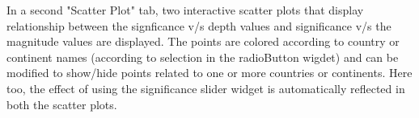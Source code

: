 \documentclass{article}
\begin{document}
		In a second "Scatter Plot" tab, two interactive scatter plots that display relationship between the signficance v/s depth values and significance v/s the magnitude values are displayed. The points are colored according to country or continent names (according to selection in the radioButton wigdet) and can be modified to show/hide points related to one or more countries or continents. Here too, the effect of using the significance slider widget is automatically reflected in both the scatter plots.
	
\end{document}
